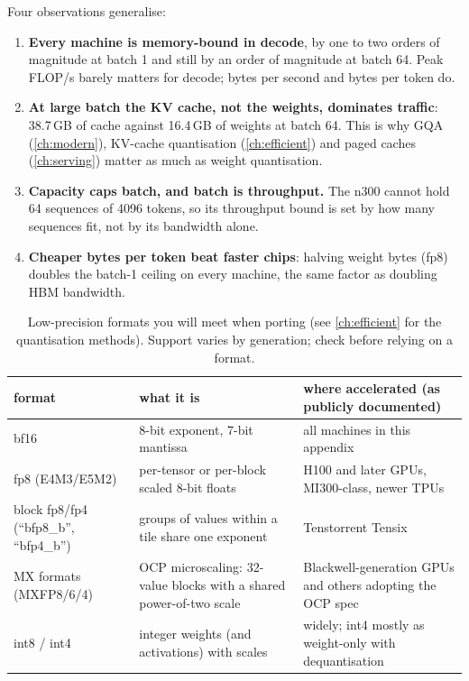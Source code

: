 Four observations generalise:
\begin{enumerate}
  \item \textbf{Every machine is memory-bound in decode}, by one to two orders of magnitude at
    batch 1 and still by an order of magnitude at batch 64. Peak FLOP/s barely matters for decode;
    bytes per second and bytes per token do.
  \item \textbf{At large batch the KV cache, not the weights, dominates traffic}: 38.7\,GB of cache
    against 16.4\,GB of weights at batch 64. This is why GQA (\cref{ch:modern}), KV-cache quantisation
    (\cref{ch:efficient}) and paged caches (\cref{ch:serving}) matter as much as weight quantisation.
  \item \textbf{Capacity caps batch, and batch is throughput.} The n300 cannot hold 64 sequences of
    4096 tokens, so its throughput bound is set by how many sequences fit, not by its bandwidth alone.
  \item \textbf{Cheaper bytes per token beat faster chips}: halving weight bytes (fp8) doubles the
    batch-1 ceiling on every machine, the same factor as doubling HBM bandwidth.
\end{enumerate}

\begin{table}[t]
\centering\small
\begin{tabularx}{\linewidth}{@{}lXX@{}}
\toprule
format & what it is & where accelerated (as publicly documented)\\
\midrule
bf16 & 8-bit exponent, 7-bit mantissa & all machines in this appendix\\
fp8 (E4M3/E5M2) & per-tensor or per-block scaled 8-bit floats & H100 and later GPUs, MI300-class, newer TPUs\\
block fp8/fp4 (``bfp8\_b'', ``bfp4\_b'') & groups of values within a tile share one exponent & Tenstorrent Tensix\\
MX formats (MXFP8/6/4) & OCP microscaling: 32-value blocks with a shared power-of-two scale & Blackwell-generation GPUs and others adopting the OCP spec\\
int8 / int4 & integer weights (and activations) with scales & widely; int4 mostly as weight-only with dequantisation\\
\bottomrule
\end{tabularx}
\caption{Low-precision formats you will meet when porting (see \cref{ch:efficient} for the
quantisation methods). Support varies by generation; check before relying on a format.}
\label{tab:accel:formats}
\end{table}

